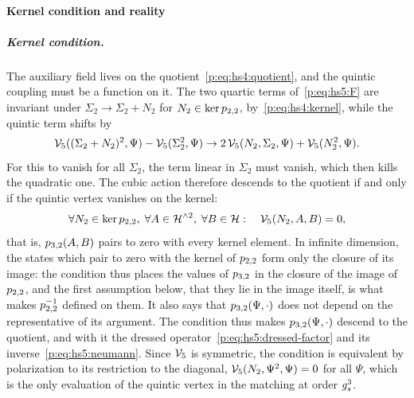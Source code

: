 \paragraph{Kernel condition and reality}

\subparagraph{Kernel condition.}

The auxiliary field lives on the quotient~\eqref{p:eq:hs4:quotient}, and the quintic coupling must be a function on it.
The two quartic terms of~\eqref{p:eq:hs5:F} are invariant under $\Sigma_2 \to \Sigma_2 + N_2$ for $N_2 \in \ker p_{2,2}$, by~\eqref{p:eq:hs4:kernel}, while the quintic term shifts by
\begin{equation}
  \mathcal{V}_{5}((\Sigma_2 + N_2)^2, \Psi) - \mathcal{V}_{5}(\Sigma_2^2, \Psi)
    \to 2 \, \mathcal{V}_{5}(N_2, \Sigma_2, \Psi) + \mathcal{V}_{5}(N_2^2, \Psi).
\end{equation}
For this to vanish for all $\Sigma_2$, the term linear in $\Sigma_2$ must vanish, which then kills the quadratic one.
The cubic action therefore descends to the quotient if and only if the quintic vertex vanishes on the kernel:
\begin{equation}
  \label{p:eq:hs5:kernel-condition}
  \forall N_2 \in \ker p_{2,2}, \;
  \forall A \in \mathcal{H}^{\wedge 2}, \;
  \forall B \in \mathcal{H}:
  \quad
  \mathcal{V}_{5}(N_2, A, B)
    = 0,
\end{equation}
that is, $p_{3,2}(A, B)$ pairs to zero with every kernel element.
In infinite dimension, the states which pair to zero with the kernel of $p_{2,2}$ form only the closure of its image: the condition thus places the values of $p_{3,2}$ in the closure of the image of $p_{2,2}$, and the first assumption below, that they lie in the image itself, is what makes $p_{2,2}^{-1}$ defined on them.
It also says that $p_{3,2}(\Psi, \cdot)$ does not depend on the representative of its argument.
The condition thus makes $p_{3,2}(\Psi, \cdot)$ descend to the quotient, and with it the dressed operator~\eqref{p:eq:hs5:dressed-factor} and its inverse~\eqref{p:eq:hs5:neumann}.
Since $\mathcal{V}_{5}$ is symmetric, the condition is equivalent by polarization to its restriction to the diagonal, $\mathcal{V}_{5}(N_2, \Psi^2, \Psi) = 0$ for all $\Psi$, which is the only evaluation of the quintic vertex in the matching at order $g_s^3$.


